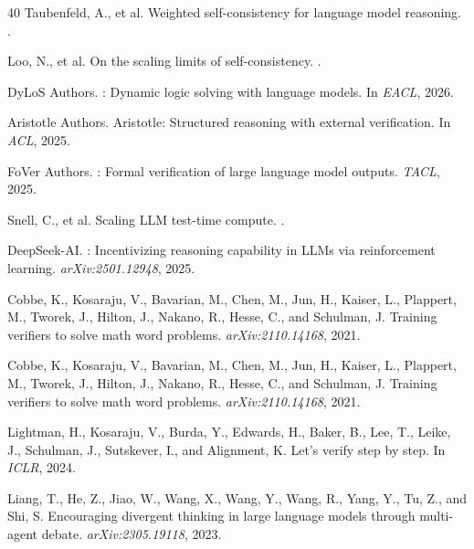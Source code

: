 \documentclass[11pt,a4paper]{article}
\begin{document}
\begin{thebibliography}{40}
Taubenfeld, A., et al.
\newblock Weighted self-consistency for language model reasoning.
.

Loo, N., et al.
\newblock On the scaling limits of self-consistency.
.

{DyLoS Authors}.
: Dynamic logic solving with language models.
\newblock In \emph{EACL}, 2026.

{Aristotle Authors}.
\newblock Aristotle: Structured reasoning with external verification.
\newblock In \emph{ACL}, 2025.

{FoVer Authors}.
: Formal verification of large language model outputs.
\newblock \emph{TACL}, 2025.

Snell, C., et al.
\newblock Scaling {LLM} test-time compute.
.

{DeepSeek-AI}.
: Incentivizing reasoning capability in {LLMs} via reinforcement learning.
\newblock \emph{arXiv:2501.12948}, 2025.

Cobbe, K., Kosaraju, V., Bavarian, M., Chen, M., Jun, H., Kaiser, L., Plappert, M., Tworek, J., Hilton, J., Nakano, R., Hesse, C., and Schulman, J.
\newblock Training verifiers to solve math word problems.
\newblock \emph{arXiv:2110.14168}, 2021.

Cobbe, K., Kosaraju, V., Bavarian, M., Chen, M., Jun, H., Kaiser, L., Plappert, M., Tworek, J., Hilton, J., Nakano, R., Hesse, C., and Schulman, J.
\newblock Training verifiers to solve math word problems.
\newblock \emph{arXiv:2110.14168}, 2021.

Lightman, H., Kosaraju, V., Burda, Y., Edwards, H., Baker, B., Lee, T., Leike, J., Schulman, J., Sutskever, I., and Alignment, K.
\newblock Let's verify step by step.
\newblock In \emph{ICLR}, 2024.

Liang, T., He, Z., Jiao, W., Wang, X., Wang, Y., Wang, R., Yang, Y., Tu, Z., and Shi, S.
\newblock Encouraging divergent thinking in large language models through multi-agent debate.
\newblock \emph{arXiv:2305.19118}, 2023.


\end{thebibliography}
\end{document}
